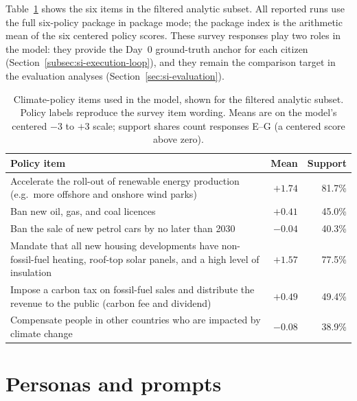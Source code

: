 \documentclass[pdflatex,sn-mathphys-num]{sn-jnl}%
\theoremstyle{thmstyleone}%
\theoremstyle{thmstyletwo}%
\theoremstyle{thmstylethree}%
\begin{document}
Table~\ref{tab:si-policy-baselines} shows the six items in the filtered analytic
subset. All reported runs use the full six-policy package in package mode; the
package index is the arithmetic mean of the six centered policy scores. These
survey responses play two roles in the model: they provide the Day~0
ground-truth anchor for each citizen (Section~\ref{subsec:si-execution-loop}), and
they remain the comparison target in the evaluation analyses
(Section~\ref{sec:si-evaluation}).

\begin{table}[t]
	\centering
	\footnotesize
	\caption{Climate-policy items used in the model, shown for the filtered analytic subset. Policy labels reproduce the survey item wording. Means are on the model's centered $-3$ to $+3$ scale; support shares count responses E--G (a centered score above zero).}
	\label{tab:si-policy-baselines}
	\begin{tabular}{p{}rr}
		\toprule
		Policy item & Mean & Support \\
		\midrule
		Accelerate the roll-out of renewable energy production (e.g.\ more offshore and onshore wind parks) & $+1.74$ & 81.7\% \\
		Ban new oil, gas, and coal licences & $+0.41$ & 45.0\% \\
		Ban the sale of new petrol cars by no later than 2030 & $-0.04$ & 40.3\% \\
		Mandate that all new housing developments have non-fossil-fuel heating, roof-top solar panels, and a high level of insulation & $+1.57$ & 77.5\% \\
		Impose a carbon tax on fossil-fuel sales and distribute the revenue to the public (carbon fee and dividend) & $+0.49$ & 49.4\% \\
		Compensate people in other countries who are impacted by climate change & $-0.08$ & 38.9\% \\
		\bottomrule
	\end{tabular}
\end{table}


\section{Personas and prompts}\label{sec:si-personas}
\end{document}
